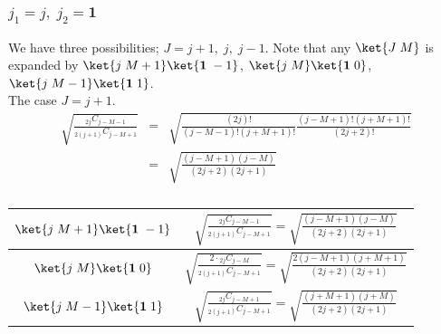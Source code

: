 \documentclass{article}
\begin{document}
\subsubsection{$j_1 = j, \;j_2=\mathbf{1}$}
\label{sec-4-3-2}
We have three possibilities; $J = j+1, \;j,\;j-1$. Note that any $\ket{J \;M}$ is expanded by $\ket{j\;M+1}\ket{\mathbf{1} \; -1}$, $\ket{j \; M}\ket{\mathbf{1}\;0}$, $\ket{j \;M-1}\ket{\mathbf{1}\;1}$.\\
 The case $J = j+1$.
\begin{eqnarray}
\sqrt{\frac{ {}_{2j}C_{j -M-1} }{{}_{2(j+1)}C_{j -M +1}}}& = &
 \sqrt{\frac{(2j)!}{(j-M-1)!(j+M+1)!} \frac{(j-M+1)!(j+M+1)!}{(2j +2)!}} \\
 & = &  \sqrt{\frac{(j-M+1)(j-M)}{(2j+2)(2j+1)} }
\end{eqnarray}
\begin{table}[htb]
  \centering 
  \caption{}\label{}
  \begin{tabular}{|c|c|}
\hline
 $\ket{j\;M+1}\ket{\mathbf{1} \; -1}$  &  
 $\displaystyle \sqrt{\frac{ {}_{2j}C_{j -M-1} }{{}_{2(j+1)}C_{j -M +1}}} = \sqrt{\frac{(j-M+1)(j-M)}{(2j+2)(2j+1)} }$  \\ \hline
 $\ket{j \; M}\ket{\mathbf{1}\;0}$  &   
 $\displaystyle \sqrt{\frac{ 2\cdot {}_{2j}C_{j -M} }{{}_{2(j+1)}C_{j -M+1}}} = \sqrt{\frac{2(j-M+1)(j+M+1)}{(2j+2)(2j+1)} }$  \\ \hline
 $\ket{j \;M-1}\ket{\mathbf{1}\;1}$  &  
 $\displaystyle \sqrt{\frac{ {}_{2j}C_{j -M+1} }{{}_{2(j+1)}C_{j -M+1 }}} = \sqrt{\frac{(j+M+1)(j+M)}{(2j+2)(2j+1)} }$  \\ \hline
\end{tabular}
\end{table}
\end{document}
